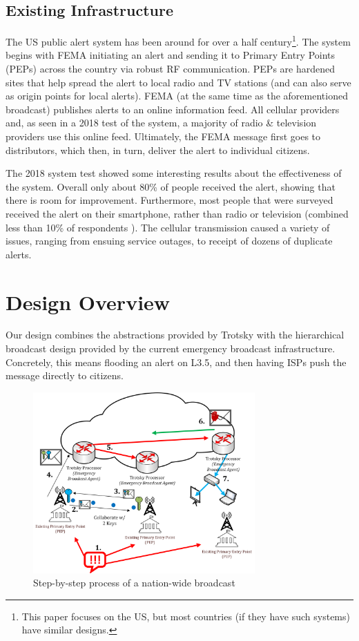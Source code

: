 \subsection{Existing Infrastructure}\label{infrabckgrnd}
The US public alert system has been around for over a half century\footnote{This paper focuses on the US, but most countries (if they have such systems) have similar designs.}. The system begins with FEMA initiating an alert and sending it to Primary Entry Points (PEPs) across the country via robust RF communication. PEPs are hardened sites that help spread the alert to local radio and TV stations (and can also serve as origin points for local alerts). FEMA (at the same time as the aforementioned broadcast) publishes alerts to an online information feed. All cellular providers and, as seen in a 2018 test of the system, a majority of radio \& television providers use this online feed. Ultimately, the FEMA message first goes to distributors, which then, in turn, deliver the alert to individual citizens. \cite{ipaws101}

The 2018 system test showed some interesting results about the effectiveness of the system. Overall only about 80\% of people received the alert, showing that there is room for improvement. Furthermore, most people that were surveyed received the alert on their smartphone, rather than radio or television (combined less than 10\% of respondents ). The cellular transmission caused a variety of issues, ranging from ensuing service outages, to receipt of dozens of duplicate alerts.\cite{weatest,everbridge}

\section{Design Overview}
Our design combines the abstractions provided by Trotsky with the hierarchical broadcast design provided by the current emergency broadcast infrastructure. Concretely, this means flooding an alert on L3.5, and then having ISPs push the message directly to citizens. 

\begin{figure}[tp]
\centering
\includegraphics[width=8.5cm]{figures/full_diagram_v2.png}
\caption{Step-by-step process of a nation-wide broadcast}
\label{fig:brdcast}
\end{figure}


